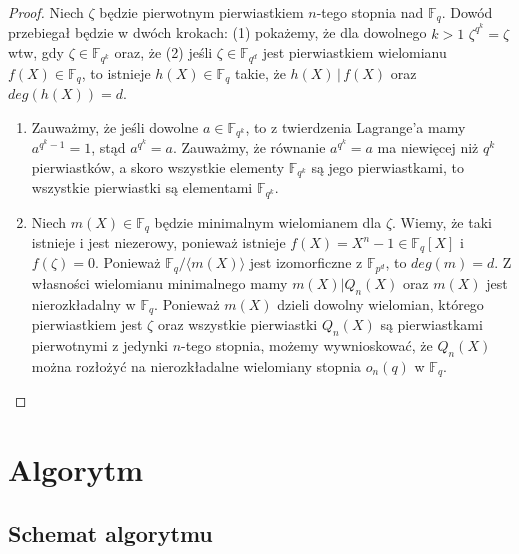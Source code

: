 \documentclass[declaration,shortabstract]{iithesis}
\theoremstyle{definition}
\theoremstyle{remark} \newtheorem{observation}{Obserwacja}
\theoremstyle{plain} \newtheorem{theorem}{Twierdzenie}
\theoremstyle{plain} \newtheorem{lemma}{Lemat}
\theoremstyle{remark} \newtheorem*{remark*}{Uwaga}
\theoremstyle{reminder} \newtheorem*{reminder*}{Przypomnienie}
\begin{document}
\begin{proof}
    Niech $\zeta$ będzie pierwotnym pierwiastkiem $n$-tego stopnia nad $\mathbb{F}_q$. Dowód przebiegał będzie w dwóch krokach: (1) pokażemy, że dla dowolnego $k > 1$ $\zeta^{q^k}=\zeta$ wtw, gdy $\zeta \in \mathbb{F}_{q^k}$ oraz, że (2) jeśli $\zeta \in \mathbb{F}_{q^d}$ jest pierwiastkiem wielomianu $f(X) \in \mathbb{F}_q$, to istnieje $h(X) \in \mathbb{F}_q$ takie, że $h(X) \, | \, f(X)$ oraz $deg(h(X)) = d$.\newline
    \begin{enumerate}[label=(\arabic*),leftmargin=.4in]
        \item Zauważmy, że jeśli dowolne $a \in \mathbb{F}_{q^k}$, to z twierdzenia Lagrange'a mamy $a^{q^k-1} = 1$, stąd $a^{q^k} = a$. Zauważmy, że równanie $a^{q^k} = a$ ma niewięcej niż $q^k$ pierwiastków, a skoro wszystkie elementy $\mathbb{F}_{q^k}$ są jego pierwiastkami, to wszystkie pierwiastki są elementami $\mathbb{F}_{q^k}$.
        \item Niech $m(X) \in \mathbb{F}_q$ będzie minimalnym wielomianem dla $\zeta$. Wiemy, że taki istnieje i jest niezerowy, ponieważ istnieje $f(X) = X^{n} - 1 \in \mathbb{F}_q[X]$ i $f(\zeta) = 0$. Ponieważ $\mathbb{F}_q / \langle m(X) \rangle$ jest izomorficzne z $\mathbb{F}_{p^d}$, to $deg(m) = d$. Z własności wielomianu minimalnego mamy $m(X) | Q_n(X)$ oraz $m(X)$ jest nierozkładalny w $\mathbb{F}_q$. \newline 
        Ponieważ $m(X)$ dzieli dowolny wielomian, którego pierwiastkiem jest $\zeta$ oraz wszystkie pierwiastki $Q_n(X)$ są pierwiastkami pierwotnymi z jedynki $n$-tego stopnia, możemy wywnioskować, że $Q_n(X)$ można rozłożyć na nierozkładalne wielomiany stopnia $o_n(q)$ w $\mathbb{F}_q$.
    \end{enumerate}
\end{proof}
	
\chapter{Algorytm}
	
\section{Schemat algorytmu}
	
\end{document}
